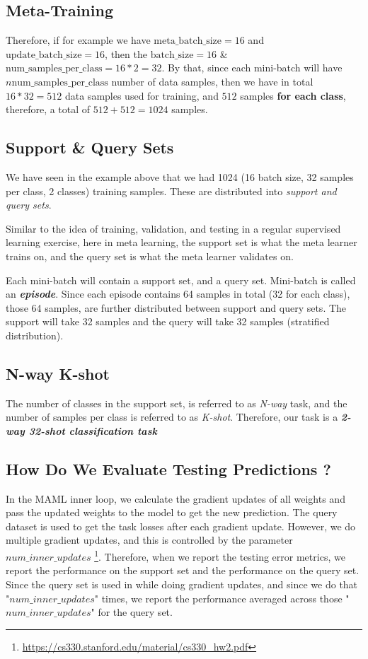 \documentclass{article}
\begin{document}
\subsection*{Meta-Training}
\noindent Therefore, if for example we have $\text{meta\_batch\_size} = 16$ and $\text{update\_batch\_size}=16$, then the $\text{batch\_ size} = 16 $ \& $\text{num\_samples\_per\_class} = 16 * 2 = 32$. By that, since each mini-batch will have $n\text{num\_samples\_per\_class}$ number of data samples, then we have in total $16 * 32 = 512$ data samples used for training, and $512$ samples \textbf{for each class}, therefore, a total of $512 + 512 = 1024$ samples.

\subsection{Support \& Query Sets}
We have seen in the example above that we had 1024 (16 batch size, 32 samples per class, 2 classes) training samples. These are distributed into \textit{support and query sets}. 

\noindent Similar to the idea of training, validation, and testing in a regular supervised learning exercise, here in meta learning, the support set is what the meta learner trains on, and the query set is what the meta learner validates on.

\noindent Each mini-batch will contain a support set, and a query set. Mini-batch is called an \textbf{\textit{episode}}. Since each episode contains 64 samples in total (32 for each class), those 64 samples, are further distributed between support and query sets. The support will take 32 samples and the query will take 32 samples (stratified distribution).

\subsection*{N-way K-shot}
The number of classes in the support set, is referred to as \textit{N-way} task, and the number of samples per class is referred to as \textit{K-shot}. Therefore, our task is a \textit{\textbf{2-way 32-shot classification task}} 


\subsection*{How Do We Evaluate Testing Predictions ?}
In the MAML inner loop, we calculate the gradient updates of all weights and pass the updated weights to the model to get the new prediction. The query dataset is used to get the task losses after each gradient update. However, we do multiple gradient updates, and this is controlled by the parameter $num\_inner\_updates$ \footnote{\url{https://cs330.stanford.edu/material/cs330_hw2.pdf}}. Therefore, when we report the testing error metrics, we report the performance on the support set and the performance on the query set. Since the query set is used in while doing gradient updates, and since we do that "$num\_inner\_updates$" times, we report the performance averaged across those "$num\_inner\_updates$" for the query set. 
\end{document}
